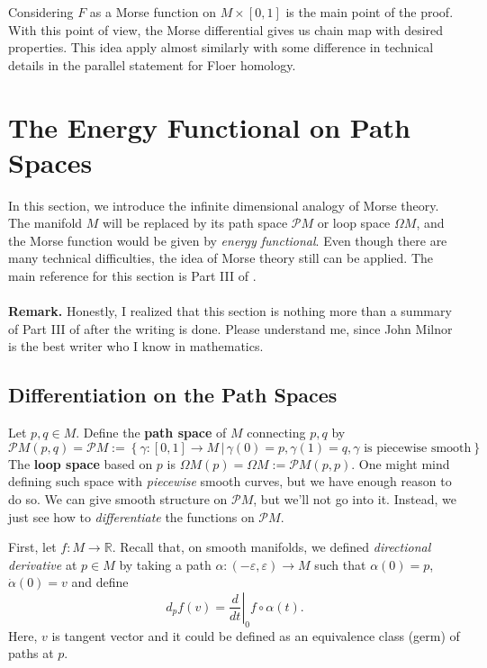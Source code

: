 \documentclass{article}
\newcommand{\R}{\mathbb{R}}
\newcommand{\ep}{\varepsilon}
\newcommand{\Om}{\Omega}
\newcommand{\PM}{\mathcal{P}M}
\begin{document}
Considering $F$ as a Morse function on $M\times[0,1]$ is the main point of the proof.
With this point of view, the Morse differential gives us chain map with desired properties.
This idea apply almost similarly with some difference in technical details in the parallel statement for Floer homology.


\newpage
\section{The Energy Functional on Path Spaces}

In this section, we introduce the infinite dimensional analogy of Morse theory.
The manifold $M$ will be replaced by its path space $\PM$ or loop space $\Om M$, and the Morse function would be given by \emph{energy functional}.
Even though there are many technical difficulties, the idea of Morse theory still can be applied.
The main reference for this section is Part III of \cite{m1}.\\
\,\,\\
\textbf{Remark.}
Honestly, I realized that this section is nothing more than a summary of Part III of \cite{m1} after the writing is done.
Please understand me, since John Milnor is the best writer who I know in mathematics.

\subsection{Differentiation on the Path Spaces}

Let $p,q\in M$.
Define the \textbf{path space} of $M$ connecting $p,q$ by
	$$\PM(p,q)=\PM:=\left\{\gamma:[0,1]\to M\,|\,\gamma(0)=p,\gamma(1)=q,\gamma\text{ is piecewise smooth}\right\}$$
The \textbf{loop space} based on $p$ is $\Om M(p)=\Om M:=\PM(p,p)$.
One might mind defining such space with \emph{piecewise} smooth curves, but we have enough reason to do so.
We can give smooth structure on $\PM$, but we'll not go into it.
Instead, we just see how to \emph{differentiate} the functions on $\PM$.

First, let $f:M\to\R$.
Recall that, on smooth manifolds, we defined \emph{directional derivative} at $p\in M$ by taking a path $\alpha:(-\ep,\ep)\to M$ such that $\alpha(0)=p$, $\dot{\alpha}(0)=v$ and define
	$$d_pf(v)=\left.\frac{d}{dt}\right|_{0}f\circ\alpha(t).$$
Here, $v$ is tangent vector and it could be defined as an equivalence class (germ) of paths at $p$.
\end{document}
